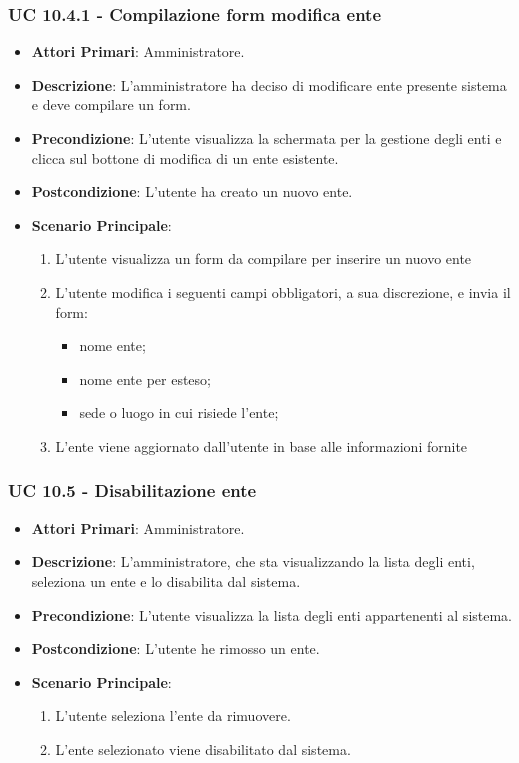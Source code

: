 			\subsubsection{UC 10.4.1 - Compilazione form modifica ente}
			\begin{itemize}
				\item \textbf{Attori Primari}: Amministratore.
				\item \textbf{Descrizione}: L'amministratore ha deciso di modificare ente presente sistema e deve compilare un form.
				\item \textbf{Precondizione}: L'utente visualizza la schermata per la gestione degli enti e clicca sul bottone di modifica di un ente esistente.
				\item \textbf{Postcondizione}: L'utente ha creato un nuovo ente.
				\item \textbf{Scenario Principale}:
				\begin{enumerate}
					\item{L'utente visualizza un form da compilare per inserire un nuovo ente}
					\item{L'utente modifica i seguenti campi obbligatori, a sua discrezione, e invia il form:}
					\begin{itemize}
						\item nome ente;
						\item nome ente per esteso;
						\item sede o luogo in cui risiede l'ente;
					\end{itemize}
					\item{L'ente viene aggiornato dall'utente in base alle informazioni fornite}
				\end{enumerate}	
			\end{itemize}		

			\subsubsection{UC 10.5 - Disabilitazione ente}
			\begin{itemize}
				\item \textbf{Attori Primari}: Amministratore.
				\item \textbf{Descrizione}: L'amministratore, che sta visualizzando la lista degli enti, seleziona un ente e lo disabilita dal sistema.
				\item \textbf{Precondizione}: L'utente visualizza la lista degli enti appartenenti al sistema.
				\item \textbf{Postcondizione}: L'utente he rimosso un ente.
				\item \textbf{Scenario Principale}:
				\begin{enumerate}
					\item{L'utente seleziona l'ente da rimuovere.}
					\item{L'ente selezionato viene disabilitato dal sistema.}
				\end{enumerate}	
			\end{itemize}		